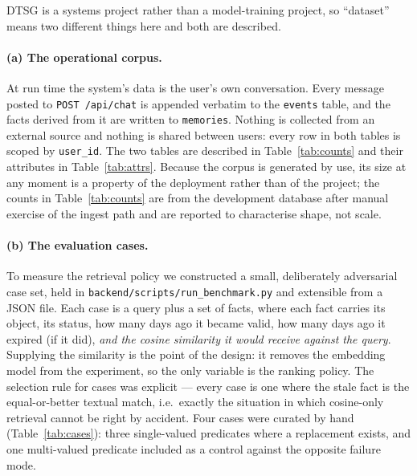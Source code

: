 \documentclass[11pt,a4paper]{article}
\begin{document}
DTSG is a systems project rather than a model-training project, so ``dataset''
means two different things here and both are described.

\paragraph{(a) The operational corpus.} At run time the system's data is the
user's own conversation. Every message posted to \texttt{POST /api/chat} is
appended verbatim to the \texttt{events} table, and the facts derived from it
are written to \texttt{memories}. Nothing is collected from an external source
and nothing is shared between users: every row in both tables is scoped by
\texttt{user\_id}. The two tables are described in Table~\ref{tab:counts} and
their attributes in Table~\ref{tab:attrs}. Because the corpus is generated by
use, its size at any moment is a property of the deployment rather than of the
project; the counts in Table~\ref{tab:counts} are from the development database
after manual exercise of the ingest path and are reported to characterise
shape, not scale.

\paragraph{(b) The evaluation cases.} To measure the retrieval policy we
constructed a small, deliberately adversarial case set, held in
\texttt{backend/scripts/run\_benchmark.py} and extensible from a JSON file.
Each case is a query plus a set of facts, where each fact carries its object,
its status, how many days ago it became valid, how many days ago it expired (if
it did), \emph{and the cosine similarity it would receive against the query}.
Supplying the similarity is the point of the design: it removes the embedding
model from the experiment, so the only variable is the ranking policy. The
selection rule for cases was explicit --- every case is one where the stale
fact is the equal-or-better textual match, i.e.\ exactly the situation in which
cosine-only retrieval cannot be right by accident. Four cases were curated by
hand (Table~\ref{tab:cases}): three single-valued predicates where a
replacement exists, and one multi-valued predicate included as a control
against the opposite failure mode.
\end{document}
